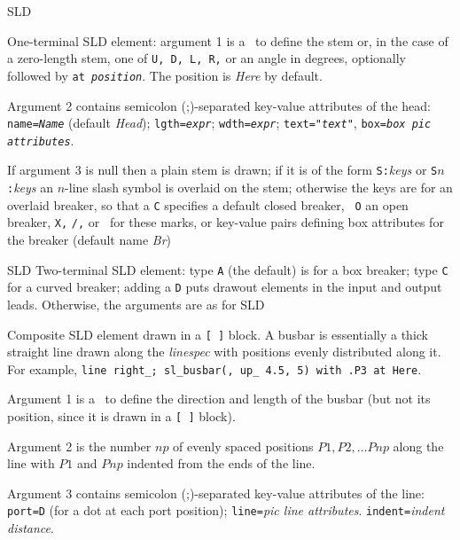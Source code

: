   {SLD}
  {One-terminal SLD element: argument 1 is a \linespec\ to define the stem
   or, in the case of a zero-length stem, one of {\tt U, D, L, R,} or an
   angle in degrees, optionally followed by {\tt at {\sl position}}.
   The position is {\sl Here} by default.

   Argument 2 contains semicolon (;)-separated key-value attributes
   of the head:
   {\tt name={\sl{}Name}} (default {\sl Head});
   {\tt lgth={\sl{}expr}};
   {\tt wdth={\sl{}expr}};
   {\tt text="{\sl{}text}"},
   {\tt box={\sl{}box pic attributes}}.

   If argument 3 is null then a plain stem is drawn; if it is of the
   form {\tt S:}{\sl keys} or {\tt S$n$:}{\sl keys} an $n$-line slash
   symbol is overlaid on the stem; otherwise the keys are for an overlaid
   breaker, so that a {\tt C} specifies a default closed breaker, {\tt
   O} an open breaker, {\tt X,} {\tt /,} or \bsl\ for these marks, or
    key-value pairs defining box attributes
   for the breaker (default name {\sl Br})

   }
  {SLD}
  {Two-terminal SLD element:
   type {\tt A} (the default) is for a box breaker; type 
   {\tt C} for a curved breaker; adding a {\tt D} puts drawout elements
   in the input and output leads.
   Otherwise, the arguments are as for 
   }
  {SLD}
  {Composite SLD element drawn in a {\tt [ ]} block.  A busbar is
   essentially a thick straight line 
   drawn along the {\sl linespec} with positions evenly distributed
   along it.  For example,
     {\tt line right\_; sl\_busbar(, up\_ 4.5, 5) with .P3 at Here}.

   Argument 1 is a \linespec\ to define the direction and length of the
     busbar (but not its position, since it is drawn in a {\tt [ ]} block).

   Argument 2 is the number $np$ of evenly spaced positions
     $P1, P2, \ldots Pnp$ along the line with $P1$ and $Pnp$ indented
     from the ends of the line.

   Argument 3 contains semicolon (;)-separated key-value attributes
     of the line:
   {\tt port=D} (for a dot at each port position);
   {\tt line=}{\sl pic line attributes}.
   {\tt indent=}{\sl indent distance}.
   }
